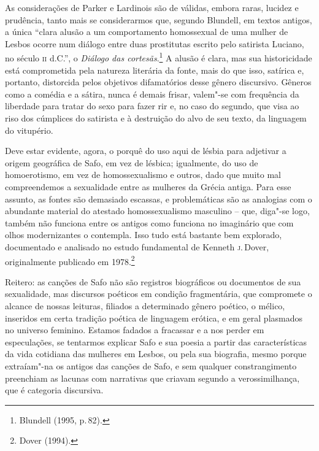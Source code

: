 As considerações de Parker e Lardinois são de válidas, embora raras, lucidez e
prudência, tanto mais se considerarmos que, segundo Blundell, em
textos antigos, a única “clara alusão a um comportamento homossexual de uma
mulher de Lesbos ocorre num diálogo entre duas prostitutas escrito pelo
satirista Luciano, no século \textsc{ii} d.C.”, o \textit{Diálogo das cortesãs}.\footnote{Blundell (1995, p.\,82).} A
alusão é clara, mas sua historicidade está comprometida pela natureza
literária da fonte, mais do que isso, satírica e, portanto, distorcida pelos objetivos difamatórios desse gênero discursivo. Gêneros como a
comédia e a sátira, nunca é demais frisar, valem"-se com frequência da liberdade
para tratar do sexo para fazer rir e, no caso do segundo, que visa ao riso dos
cúmplices do satirista e à destruição do alvo de seu texto, da linguagem do
vitupério. 

Deve estar evidente, agora, o porquê do uso aqui de lésbia para adjetivar a origem geográfica de Safo, em vez de lésbica; igualmente, do uso de homoerotismo, em vez de homossexualismo e outros, dado que muito mal compreendemos a sexualidade entre as mulheres da Grécia antiga. Para esse assunto, as fontes são demasiado escassas, e problemáticas são as analogias
com o abundante material do atestado homossexualismo masculino -- que,
diga"-se logo, também não funciona entre os antigos como funciona no imaginário
que com olhos modernizantes o contempla. Isso tudo está bastante
bem explorado, documentado e analisado no estudo fundamental de Kenneth \textsc{j}.\,Dover, 
originalmente publicado em 1978.\footnote{ Dover (1994).}

Reitero: as canções de Safo não
são registros biográficos ou documentos de sua sexualidade, mas discursos
poéticos em condição fragmentária, que compromete o alcance de nossas leituras,
filiados a determinado gênero poético, o mélico, inseridos em certa tradição
poética de linguagem erótica, e em geral plasmados no universo feminino. Estamos fadados a fracassar e a nos perder em
especulações, se tentarmos explicar Safo e sua poesia a partir das
características da vida cotidiana das mulheres em Lesbos, ou pela sua
biografia, mesmo porque extraíam"-na os antigos das canções de Safo, e
sem qualquer constrangimento preenchiam as lacunas com narrativas
que criavam segundo a verossimilhança, que é categoria discursiva.

